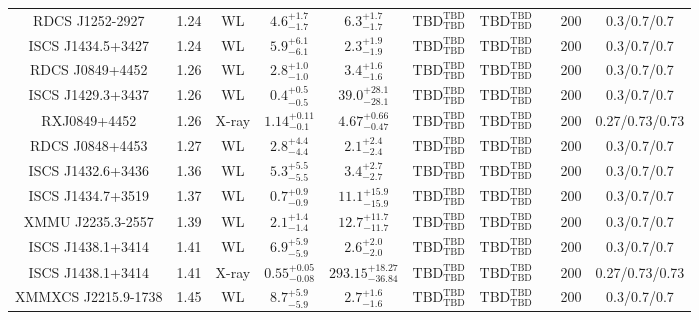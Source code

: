 \begin{table}
\begin{tabular}{cccccccccc}
RDCS J1252-2927 & 1.24 & WL & ${4.6}^{+1.7}_{-1.7}$ & ${6.3}^{+1.7}_{-1.7}$ & ${\mathrm{TBD}}^{\mathrm{TBD}}_{\mathrm{TBD}}$ & ${\mathrm{TBD}}^{\mathrm{TBD}}_{\mathrm{TBD}}$ & \citet{SE14.1} & 200 & 0.3/0.7/0.7 \\
ISCS J1434.5+3427 & 1.24 & WL & ${5.9}^{+6.1}_{-6.1}$ & ${2.3}^{+1.9}_{-1.9}$ & ${\mathrm{TBD}}^{\mathrm{TBD}}_{\mathrm{TBD}}$ & ${\mathrm{TBD}}^{\mathrm{TBD}}_{\mathrm{TBD}}$ & \citet{SE14.1} & 200 & 0.3/0.7/0.7 \\
RDCS J0849+4452 & 1.26 & WL & ${2.8}^{+1.0}_{-1.0}$ & ${3.4}^{+1.6}_{-1.6}$ & ${\mathrm{TBD}}^{\mathrm{TBD}}_{\mathrm{TBD}}$ & ${\mathrm{TBD}}^{\mathrm{TBD}}_{\mathrm{TBD}}$ & \citet{SE14.1} & 200 & 0.3/0.7/0.7 \\
ISCS J1429.3+3437 & 1.26 & WL & ${0.4}^{+0.5}_{-0.5}$ & ${39.0}^{+28.1}_{-28.1}$ & ${\mathrm{TBD}}^{\mathrm{TBD}}_{\mathrm{TBD}}$ & ${\mathrm{TBD}}^{\mathrm{TBD}}_{\mathrm{TBD}}$ & \citet{SE14.1} & 200 & 0.3/0.7/0.7 \\
RXJ0849+4452 & 1.26 & X-ray & ${1.14}^{+0.11}_{-0.1}$ & ${4.67}^{+0.66}_{-0.47}$ & ${\mathrm{TBD}}^{\mathrm{TBD}}_{\mathrm{TBD}}$ & ${\mathrm{TBD}}^{\mathrm{TBD}}_{\mathrm{TBD}}$ & \citet{BA14.1} & 200 & 0.27/0.73/0.73 \\
RDCS J0848+4453 & 1.27 & WL & ${2.8}^{+4.4}_{-4.4}$ & ${2.1}^{+2.4}_{-2.4}$ & ${\mathrm{TBD}}^{\mathrm{TBD}}_{\mathrm{TBD}}$ & ${\mathrm{TBD}}^{\mathrm{TBD}}_{\mathrm{TBD}}$ & \citet{SE14.1} & 200 & 0.3/0.7/0.7 \\
ISCS J1432.6+3436 & 1.36 & WL & ${5.3}^{+5.5}_{-5.5}$ & ${3.4}^{+2.7}_{-2.7}$ & ${\mathrm{TBD}}^{\mathrm{TBD}}_{\mathrm{TBD}}$ & ${\mathrm{TBD}}^{\mathrm{TBD}}_{\mathrm{TBD}}$ & \citet{SE14.1} & 200 & 0.3/0.7/0.7 \\
ISCS J1434.7+3519 & 1.37 & WL & ${0.7}^{+0.9}_{-0.9}$ & ${11.1}^{+15.9}_{-15.9}$ & ${\mathrm{TBD}}^{\mathrm{TBD}}_{\mathrm{TBD}}$ & ${\mathrm{TBD}}^{\mathrm{TBD}}_{\mathrm{TBD}}$ & \citet{SE14.1} & 200 & 0.3/0.7/0.7 \\
XMMU J2235.3-2557 & 1.39 & WL & ${2.1}^{+1.4}_{-1.4}$ & ${12.7}^{+11.7}_{-11.7}$ & ${\mathrm{TBD}}^{\mathrm{TBD}}_{\mathrm{TBD}}$ & ${\mathrm{TBD}}^{\mathrm{TBD}}_{\mathrm{TBD}}$ & \citet{SE14.1} & 200 & 0.3/0.7/0.7 \\
ISCS J1438.1+3414 & 1.41 & WL & ${6.9}^{+5.9}_{-5.9}$ & ${2.6}^{+2.0}_{-2.0}$ & ${\mathrm{TBD}}^{\mathrm{TBD}}_{\mathrm{TBD}}$ & ${\mathrm{TBD}}^{\mathrm{TBD}}_{\mathrm{TBD}}$ & \citet{SE14.1} & 200 & 0.3/0.7/0.7 \\
ISCS J1438.1+3414 & 1.41 & X-ray & ${0.55}^{+0.05}_{-0.08}$ & ${293.15}^{+18.27}_{-36.84}$ & ${\mathrm{TBD}}^{\mathrm{TBD}}_{\mathrm{TBD}}$ & ${\mathrm{TBD}}^{\mathrm{TBD}}_{\mathrm{TBD}}$ & \citet{BA14.1} & 200 & 0.27/0.73/0.73 \\
XMMXCS J2215.9-1738 & 1.45 & WL & ${8.7}^{+5.9}_{-5.9}$ & ${2.7}^{+1.6}_{-1.6}$ & ${\mathrm{TBD}}^{\mathrm{TBD}}_{\mathrm{TBD}}$ & ${\mathrm{TBD}}^{\mathrm{TBD}}_{\mathrm{TBD}}$ & \citet{SE14.1} & 200 & 0.3/0.7/0.7 \\
\end{tabular}
\end{table}
